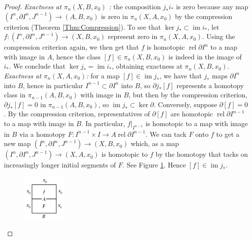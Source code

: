 \documentclass[reqno]{amsart}
\theoremstyle{definition}
\theoremstyle{remark}
\DeclareMathOperator{\im}{im}
\DeclareMathOperator{\rel}{rel}
\begin{document}
  \begin{proof}
      \textit{Exactness at $\pi_n
      \left( X,B,x_0 \right) $ :} the composition
      $j_* i_*$ is zero because any
      map $\left( I^{n}, \partial I^{n},
      J^{n-1}\right) \to \left( A,B,x_0 \right) $ 
      is zero in $\pi_n \left( X, A, x_0 \right) $ by the
      compression criterion (Theorem \ref{Thm:Compression}).
      To see that $\ker j_* \subset 
      \im i_*$, let
      $f \colon \left( I^{n}, \partial I^{n},
      J^{n-1}\right) \to \left( X, B, x_0 \right) $ 
      represent zero in $\pi_n \left( X, A, x_0 \right) $.
      Using the compression criterion again, we
      then get that $f$ is homotopic $\rel \partial I^{n}$ 
      to a map with image in $A$, hence the class
      $\left[ f \right] \in \pi_n \left( X, B, x_0 \right) $ 
      is indeed in the image of $i_*$. We conclude that
      $\ker j_* = \im i_*$, obtaining exactness
      at $\pi_n \left( X,B, x_0 \right) $.\\
      \textit{Exactness at $\pi_n (X,A,x_0)$:} 
      for a map  $\left[ f \right] 
      \in \im j_*$, we have that
      $j_*$ maps $\partial I^{n}$ into $B$, hence
      in particular $I^{n-1} \subset \partial I^{n}$ into
      $B$, so $\partial j_* \left[ f \right] $ 
      represents a homotopy class
      in $\pi_{n-1}\left( A,B,x_0 \right) $ with
      image in $B$, but then by the compression criterion,
      $\partial j_* \left[ f \right] = 0$ in
      $\pi_{n-1} \left( A,B,x_0 \right) $, so
      $\im j_* \subset \ker \partial $.
      Conversely, suppose
      $\partial \left[ f \right] = 0$. By the compression
      criterion, representatives of $\partial \left[ f \right] $
      are homotopic $\rel \partial I^{n-1}$ to a map
      with image in $B$. In particular,
      $f|_{I^{n-1}}$ is homotopic to a map with
      image in $B$ via a homotopy $F \colon
      I^{n-1} \times I \to A \rel \partial I^{n-1}$.
      We can tack $F$ onto $f$ to get a new map
      $\left( I^{n}, \partial I^{n},
      J^{n-1}\right) \to 
      \left( X, B, x_0 \right) $ which, as
      a map
      $\left( I^{n}, \partial I^{n}, J^{n-1} \right) \to 
      \left( X, A, x_0 \right) $ is homotopic to
      $f$ by the homotopy that tacks on increasingly longer
      initial segments of $F$. See Figure
      \ref{fig:IDIWKAKX-png}. Hence
      $\left[ f \right] \in \im j_*$.

      \begin{figure}[htpb]
          \centering
          \includegraphics[width=0.2\textwidth]{Figures/IDIWKAKX.png}
          \caption{}
          \label{fig:IDIWKAKX-png}
      \end{figure}


\end{proof}
\end{document}
